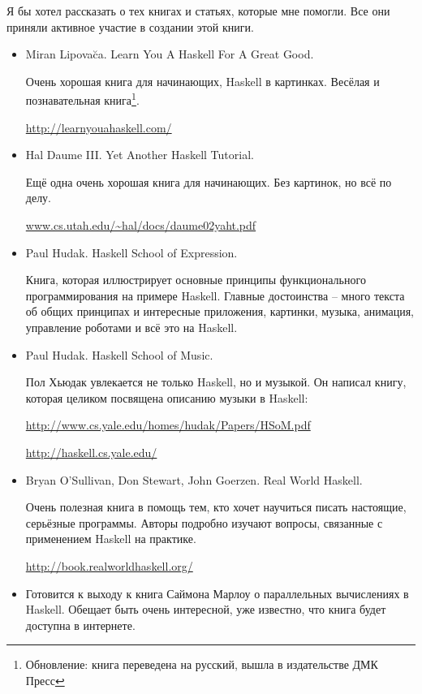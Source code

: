 Я бы хотел рассказать о тех книгах и статьях, которые 
мне помогли. Все они приняли активное участие в 
создании этой книги.


\begin{itemize}
\item Miran Lipova\u{c}a. Learn You A Haskell For A Great Good.
        
    Очень хорошая книга для начинающих, Haskell в картинках.
    Весёлая и познавательная книга\footnote{Обновление: книга переведена 
    на русский, вышла в издательстве ДМК Пресс}.

    \url{http://learnyouahaskell.com/}

\item Hal Daume III. Yet Another Haskell Tutorial.

    Ещё одна очень хорошая книга для начинающих. 
    Без картинок, но всё по делу. 

    \url{www.cs.utah.edu/~hal/docs/daume02yaht.pdf}

\item Paul Hudak. Haskell School of Expression.
    
    Книга, которая иллюстрирует основные принципы
    функционального программирования на примере Haskell.
    Главные достоинства -- много текста об общих 
    принципах и интересные приложения,
    картинки, музыка, анимация, управление роботами и 
    всё это на Haskell.

\item Paul Hudak. Haskell School of Music.

    Пол Хьюдак увлекается не только Haskell, но и музыкой.
    Он написал книгу, которая целиком посвящена описанию музыки в Haskell:

    \url{http://www.cs.yale.edu/homes/hudak/Papers/HSoM.pdf}

    \url{http://haskell.cs.yale.edu/}

\item Bryan O'Sullivan, Don Stewart, John Goerzen. Real World Haskell.

    Очень полезная книга в помощь тем, кто хочет научиться
    писать настоящие, серьёзные программы. Авторы подробно
    изучают вопросы, связанные с применением Haskell на практике.
    
    \url{http://book.realworldhaskell.org/}

\item Готовится к выходу к книга Саймона Марлоу о 
    параллельных вычислениях в Haskell. Обещает
    быть очень интересной, уже известно, что книга
    будет доступна в интернете.

\end{itemize}

